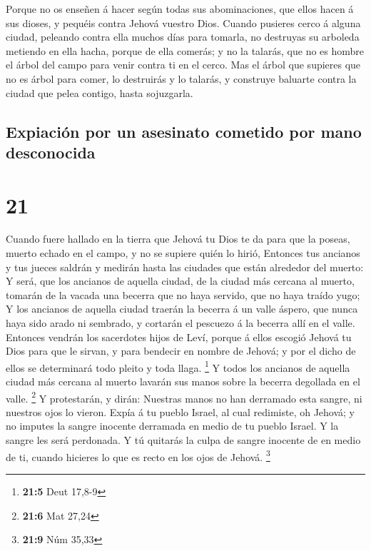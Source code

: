  Porque no os enseñen á hacer según todas sus
abominaciones, que ellos hacen á sus dioses, y pequéis contra Jehová
vuestro Dios.  Cuando pusieres cerco á alguna ciudad,
peleando contra ella muchos días para tomarla, no destruyas su arboleda
metiendo en ella hacha, porque de ella comerás; y no la talarás, que no
es hombre el árbol del campo para venir contra ti en el cerco.
 Mas el árbol que supieres que no es árbol para comer, lo
destruirás y lo talarás, y construye baluarte contra la ciudad que pelea
contigo, hasta sojuzgarla.

\hypertarget{expiaciuxf3n-por-un-asesinato-cometido-por-mano-desconocida}{%
\subsection{Expiación por un asesinato cometido por mano
desconocida}\label{expiaciuxf3n-por-un-asesinato-cometido-por-mano-desconocida}}

\hypertarget{section-20}{%
\section{21}\label{section-20}}

 Cuando fuere hallado en la tierra que Jehová tu Dios te da
para que la poseas, muerto echado en el campo, y no se supiere quién lo
hirió,  Entonces tus ancianos y tus jueces saldrán y medirán
hasta las ciudades que están alrededor del muerto:  Y será,
que los ancianos de aquella ciudad, de la ciudad más cercana al muerto,
tomarán de la vacada una becerra que no haya servido, que no haya traído
yugo;  Y los ancianos de aquella ciudad traerán la becerra á
un valle áspero, que nunca haya sido arado ni sembrado, y cortarán el
pescuezo á la becerra allí en el valle.  Entonces vendrán
los sacerdotes hijos de Leví, porque á ellos escogió Jehová tu Dios para
que le sirvan, y para bendecir en nombre de Jehová; y por el dicho de
ellos se determinará todo pleito y toda llaga. \footnote{\textbf{21:5}
  Deut 17,8-9}  Y todos los ancianos de aquella ciudad más
cercana al muerto lavarán sus manos sobre la becerra degollada en el
valle. \footnote{\textbf{21:6} Mat 27,24}  Y protestarán, y
dirán: Nuestras manos no han derramado esta sangre, ni nuestros ojos lo
vieron.  Expía á tu pueblo Israel, al cual redimiste, oh
Jehová; y no imputes la sangre inocente derramada en medio de tu pueblo
Israel. Y la sangre les será perdonada.  Y tú quitarás la
culpa de sangre inocente de en medio de ti, cuando hicieres lo que es
recto en los ojos de Jehová. \footnote{\textbf{21:9} Núm 35,33}


